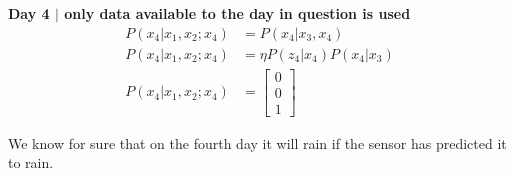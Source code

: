 \documentclass[answers]{exam}
\begin{document}
\begin{questions}
\begin{parts}
\begin{solution}
            \textbf{Day 4 $\mid$ only data available to the day in question is used}
            \begin{align*}
                P(x_4 | x_1, x_2;x_4) &= P(x_4 | x_3, x_4) \\
                P(x_4 | x_1, x_2;x_4) &= \eta P(z_4 | x_4)P(x_4 | x_3) \\
                P(x_4 | x_1, x_2;x_4) &= \begin{bmatrix}
                0 \\
                0 \\
                1
                \end{bmatrix}
            \end{align*}

            We know for sure that on the fourth day it will rain if the sensor has predicted it to rain.


\end{solution}
\end{parts}
\end{questions}
\end{document}
